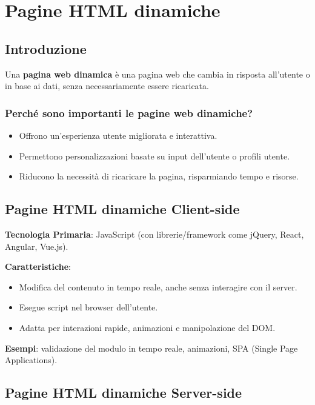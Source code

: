 \chapter{Pagine HTML dinamiche}

\section{Introduzione}

Una \textbf{pagina web dinamica} è una pagina web che cambia in risposta all'utente o in base ai dati, senza necessariamente essere ricaricata.

\subsection{Perché sono importanti le pagine web dinamiche?}

\begin{itemize}
    \item Offrono un'esperienza utente migliorata e interattiva.
    \item Permettono personalizzazioni basate su input dell'utente o profili utente.
    \item Riducono la necessità di ricaricare la pagina, risparmiando tempo e risorse.
\end{itemize}

\section{Pagine HTML dinamiche Client-side}

\textbf{Tecnologia Primaria}: JavaScript (con librerie/framework come jQuery, React, Angular, Vue.js).

\textbf{Caratteristiche}:
\begin{itemize}
    \item Modifica del contenuto in tempo reale, anche senza interagire con il server.
    \item Esegue script nel browser dell'utente.
    \item Adatta per interazioni rapide, animazioni e manipolazione del DOM.
\end{itemize}

\textbf{Esempi}: validazione del modulo in tempo reale, animazioni, SPA (Single Page Applications).

\section{Pagine HTML dinamiche Server-side}

